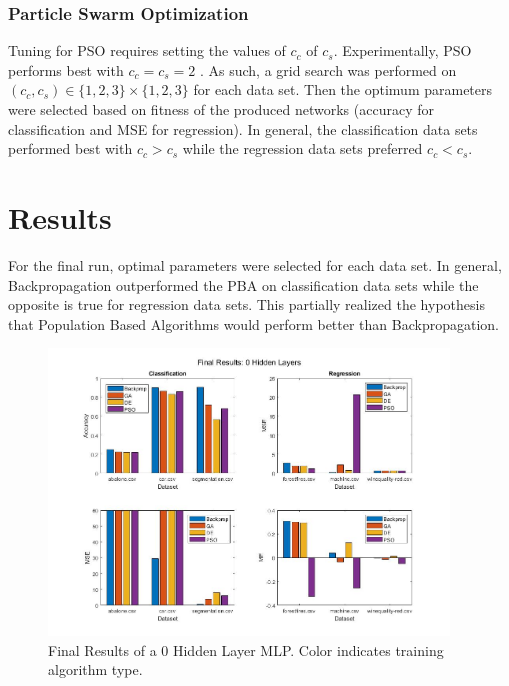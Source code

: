 \documentclass[twoside,11pt]{article}
\begin{document}
\subsubsection{Particle Swarm Optimization}	

	Tuning for PSO requires setting the values of $c_c$ of $c_s$. 
	Experimentally, PSO performs best with $c_c = c_s = 2$ \citep{empirical-pso}. 
	As such, a grid search was performed on $ (c_c, c_s) \in \{ 1, 2, 3 \} \times \{ 1, 2, 3 \} $ for each data set. 
	Then the optimum parameters were selected based on fitness of the produced networks (accuracy for classification and MSE for regression).
	In general, the classification data sets performed best with $c_c > c_s$ while the regression data sets preferred $c_c < c_s$.

\section{Results}

	For the final run, optimal parameters were selected for each data set. In general, Backpropagation outperformed the PBA on classification data sets while the opposite is true for regression data sets. This partially realized the hypothesis that Population Based Algorithms would perform better than Backpropagation.

	\begin{figure}[h]
		\centering
		\includegraphics[height=3in]{FINAL_FIGS/0_hl.jpg}
		\caption{Final Results of a 0 Hidden Layer MLP. Color indicates training algorithm type.}
		\label{0-hl}
	\end{figure}
	
\end{document}
